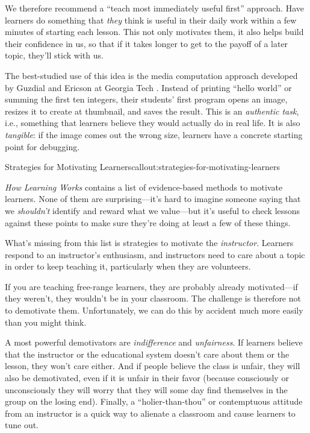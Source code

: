 We therefore recommend a ``teach most immediately useful first''
approach.  Have learners do something that \emph{they} think is useful
in their daily work within a few minutes of starting each lesson.
This not only motivates them, it also helps build their confidence in
us, so that if it takes longer to get to the payoff of a later topic,
they'll stick with us.

The best-studied use of this idea is the media computation approach
developed by Guzdial and Ericson at Georgia Tech
\cite{bib:guzdial-mediacomp-retrospective}.
Instead of printing ``hello world'' or summing the first ten integers,
their students' first program opens an image, resizes it to create at
thumbnail, and saves the result. This is an \emph{authentic task},
i.e., something that learners believe they would actually do in real
life. It is also \emph{tangible}: if the image comes out the wrong
size, learners have a concrete starting point for debugging.

\begin{callout}{Strategies for Motivating Learners}{callout:strategies-for-motivating-learners}

\emph{How Learning Works} \cite{bib:ambrose-hlw} contains a list of
evidence-based methods to motivate learners.  None of them are
surprising---it's hard to imagine someone saying that we
\emph{shouldn't} identify and reward what we value---but it's
useful to check lessons against these points to make sure they're
doing at least a few of these things.

What's missing from this list is strategies to motivate the
\emph{instructor}. Learners respond to an instructor's enthusiasm, and
instructors need to care about a topic in order to keep teaching it,
particularly when they are volunteers.

\end{callout}


If you are teaching free-range learners, they are probably already
motivated---if they weren't, they wouldn't be in your classroom. The
challenge is therefore not to demotivate them.  Unfortunately, we can
do this by accident much more easily than you might think.

A most powerful demotivators are \emph{indifference} and
\emph{unfairness}.  If learners believe that the instructor or the
educational system doesn't care about them or the lesson, they won't
care either. And if people believe the class is unfair, they will also
be demotivated, even if it is unfair in their favor (because
consciously or unconsciously they will worry that they will some day
find themselves in the group on the losing end). Finally, a
``holier-than-thou'' or contemptuous attitude from an instructor is a
quick way to alienate a classroom and cause learners to tune out.

